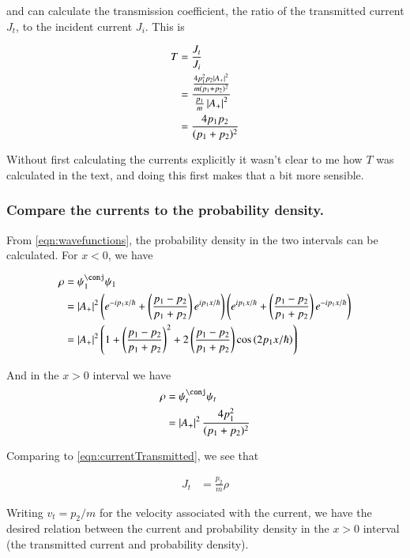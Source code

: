 \documentclass{article}
\begin{document}
and can calculate the transmission coefficient, the ratio of the transmitted current $J_t$, to the incident current $J_i$.  This is

\begin{align*}
T
&= \frac{J_t}{J_i} \\
&=
\frac{
\frac{ 4 p_1^2 p_2 \left\lvert{ A_{+} }\right\rvert^2}{m (p_1 + p_2)^2}
}
{
\frac{ p_1}{m} \left\lvert{ A_{+} }\right\rvert^2
} \\
&=
\frac{ 4 p_1 p_2 }{ (p_1 + p_2)^2}
\end{align*}

Without first calculating the currents explicitly it wasn't clear to me how $T$ was calculated in the text, and doing this first
makes that a bit more sensible.

\subsubsection{ Compare the currents to the probability density. }

From \ref{eqn:wavefunctions}, the probability density in the two intervals
can be calculated.  For $x<0$, we have

\begin{align*}
\rho
&= \psi_1^\conj \psi_1 \\
&=
\Abs{ A_{+} }^2
\left(
e^{ -i p_1 x/\hbar }
+\left( \frac{ p_1 - p_2 }{p_1 + p_2} \right) e^{ i p_1 x/\hbar }
\right)
\left(
e^{ i p_1 x/\hbar }
+\left( \frac{ p_1 - p_2 }{p_1 + p_2} \right) e^{ -i p_1 x/\hbar }
\right)
\\
&=
\Abs{ A_{+} }^2
\left(
1
+
\left( \frac{ p_1 - p_2 }{p_1 + p_2} \right)^2
+
2 \left( \frac{ p_1 - p_2 }{p_1 + p_2} \right) \cos\left(
2 p_1 x/\hbar
\right)
\right)
\end{align*}

And in the $x>0$ interval we have
\begin{align*}
\rho
&= \psi_t^\conj \psi_t \\
&=
\Abs{A_{+}}^2 \frac{4 p_1^2 }{(p_1 + p_2)^2}
\end{align*}

Comparing to \ref{eqn:currentTransmitted}, we see that

\begin{align*}
J_t &= \frac{ p_2 }{ m } \rho
\end{align*}

Writing $v_t = p_2/m$ for the velocity associated with the current, we have
the desired relation between the current and probability density in the $x>0$ interval (the transmitted current and probability density).
\end{document}

